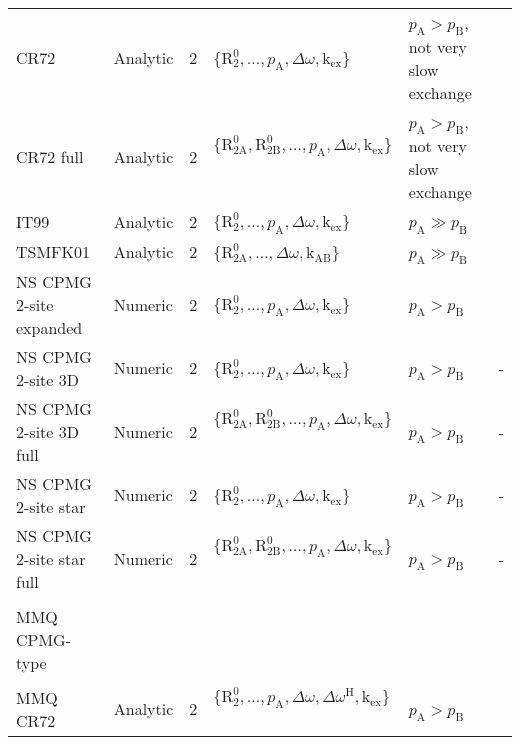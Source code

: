 \documentclass[a4paper,11pt,twoside,openright]{book}
\begin{document}
{\begin{landscape}
\begin{center}
\begin{small}
\begin{longtable}{llllll}
CR72                     & Analytic & 2     & $\{\mathrm{R}_2^0, \dots, p_\textrm{A}, \Delta\omega , \textrm{k}_\textrm{ex}\}$\               & $p_\textrm{A}> p_\textrm{B}$, not very slow exchange & \citet{CarverRichards72} \\
CR72 full                & Analytic & 2     & $\{\mathrm{R}_\mathrm{2A}^0, \mathrm{R}_\mathrm{2B}^0, \dots, p_\textrm{A}, \Delta\omega , \textrm{k}_\textrm{ex}\}$\  & $p_\textrm{A}> p_\textrm{B}$, not very slow exchange & \citet{CarverRichards72} \\
IT99                     & Analytic & 2     & $\{\mathrm{R}_2^0, \dots, p_\textrm{A}, \Delta\omega , \textrm{k}_\textrm{ex}\}$\               & $p_\textrm{A}\gg p_\textrm{B}$\                      & \citet{IshimaTorchia99} \\
TSMFK01                  & Analytic & 2     & $\{\mathrm{R}_\mathrm{2A}^0, \dots, \Delta\omega , \textrm{k}_\textrm{AB}\}$\                   & $p_\textrm{A}\gg p_\textrm{B}$\                      & \citet{Tollinger01} \\
NS CPMG 2-site expanded  & Numeric  & 2     & $\{\mathrm{R}_2^0, \dots, p_\textrm{A}, \Delta\omega , \textrm{k}_\textrm{ex}\}$\               & $p_\textrm{A}> p_\textrm{B}$\                        & \citet{Tollinger01} \\
NS CPMG 2-site 3D        & Numeric  & 2     & $\{\mathrm{R}_2^0, \dots, p_\textrm{A}, \Delta\omega , \textrm{k}_\textrm{ex}\}$\               & $p_\textrm{A}> p_\textrm{B}$\                        & - \\
NS CPMG 2-site 3D full   & Numeric  & 2     & $\{\mathrm{R}_\mathrm{2A}^0, \mathrm{R}_\mathrm{2B}^0, \dots, p_\textrm{A}, \Delta\omega , \textrm{k}_\textrm{ex}\}$\  & $p_\textrm{A}> p_\textrm{B}$\                        & - \\
NS CPMG 2-site star      & Numeric  & 2     & $\{\mathrm{R}_2^0, \dots, p_\textrm{A}, \Delta\omega , \textrm{k}_\textrm{ex}\}$\               & $p_\textrm{A}> p_\textrm{B}$\                        & - \\
NS CPMG 2-site star full & Numeric  & 2     & $\{\mathrm{R}_\mathrm{2A}^0, \mathrm{R}_\mathrm{2B}^0, \dots, p_\textrm{A}, \Delta\omega , \textrm{k}_\textrm{ex}\}$\  & $p_\textrm{A}> p_\textrm{B}$\                        & - \\
\par
\\
MMQ CPMG-type \\
\cline{1-1}
\\[-5pt]
MMQ CR72                 & Analytic & 2     & $\{\mathrm{R}_2^0, \dots, p_\textrm{A}, \Delta\omega , \Delta\omega^{\scriptscriptstyle\mathrm{H}}, \textrm{k}_\textrm{ex}\}$\         & $p_\textrm{A}> p_\textrm{B}$\                        & \citet{Korzhnev04a} \\

\end{longtable}
\end{small}
\end{center}
\end{landscape}}
\end{document}
